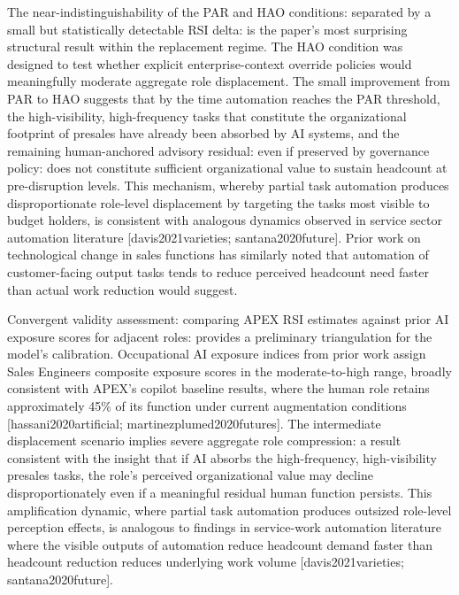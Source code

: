 \documentclass[10pt, conference]{IEEEtran}
\begin{document}
The near-indistinguishability of the PAR and HAO conditions: separated by a small but statistically detectable RSI delta: is the paper's most surprising structural result within the replacement regime. The HAO condition was designed to test whether explicit enterprise-context override policies would meaningfully moderate aggregate role displacement. The small improvement from PAR to HAO suggests that by the time automation reaches the PAR threshold, the high-visibility, high-frequency tasks that constitute the organizational footprint of presales have already been absorbed by AI systems, and the remaining human-anchored advisory residual: even if preserved by governance policy: does not constitute sufficient organizational value to sustain headcount at pre-disruption levels. This mechanism, whereby partial task automation produces disproportionate role-level displacement by targeting the tasks most visible to budget holders, is consistent with analogous dynamics observed in service sector automation literature [davis2021varieties; santana2020future]. Prior work on technological change in sales functions \cite{groene2024introduction} has similarly noted that automation of customer-facing output tasks tends to reduce perceived headcount need faster than actual work reduction would suggest.

Convergent validity assessment: comparing APEX RSI estimates against prior AI exposure scores for adjacent roles: provides a preliminary triangulation for the model's calibration. Occupational AI exposure indices from prior work assign Sales Engineers composite exposure scores in the moderate-to-high range, broadly consistent with APEX's copilot baseline results, where the human role retains approximately 45\% of its function under current augmentation conditions [hassani2020artificial; martinezplumed2020futures]. The intermediate displacement scenario implies severe aggregate role compression: a result consistent with the insight that if AI absorbs the high-frequency, high-visibility presales tasks, the role's perceived organizational value may decline disproportionately even if a meaningful residual human function persists. This amplification dynamic, where partial task automation produces outsized role-level perception effects, is analogous to findings in service-work automation literature where the visible outputs of automation reduce headcount demand faster than headcount reduction reduces underlying work volume [davis2021varieties; santana2020future].
\end{document}
